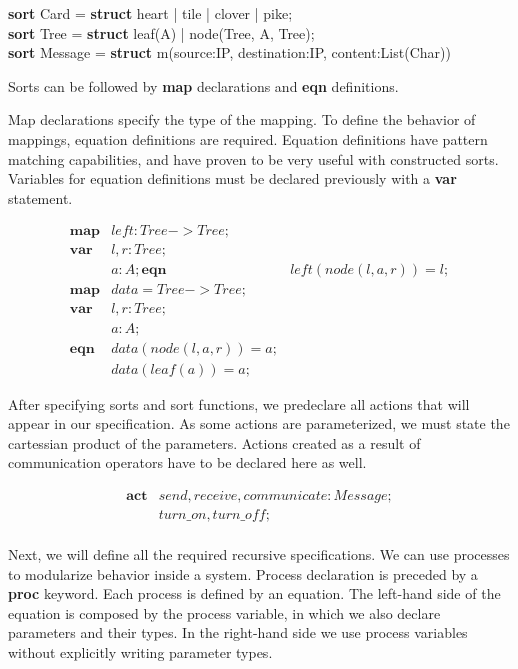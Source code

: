 \documentclass[11pt]{article}
\theoremstyle{definition}
\theoremstyle{plain}
\theoremstyle{definition}
\begin{document}
\begin{center}
	\textbf{sort} Card = \textbf{struct} heart | tile | clover | pike; \\
	\textbf{sort} Tree = \textbf{struct} leaf(A) | node(Tree, A, Tree); \\
	\textbf{sort} Message = \textbf{struct} m(source:IP, destination:IP, content:List(Char))
\end{center}

Sorts can be followed by \textbf{map} declarations and \textbf{eqn} definitions.

Map declarations specify the type of the mapping. To define the behavior of mappings, equation definitions are required. Equation definitions have pattern matching capabilities, and have proven to be very useful with constructed sorts. Variables for equation definitions must be declared previously with a \textbf{var} statement.

\begin{align}
	\textbf{map} & left : Tree -> Tree; \\
	\textbf{var} & l, r : Tree; \\
	& a : A;
	\textbf{eqn} & left(node(l,a,r)) = l; \\
	\textbf{map} & data = Tree -> Tree; \\
	\textbf{var} & l, r : Tree; \\
		& a : A; \\
	\textbf{eqn} & data(node(l,a,r)) = a;  \\
	& data(leaf(a)) = a;
\end{align}

After specifying sorts and sort functions, we predeclare all actions that will appear in our specification. As some actions are parameterized, we must state the cartessian product of the parameters. Actions created as a result of communication operators have to be declared here as well.

\begin{align}
	\textbf{act} & send, receive, communicate : Message; \\
				 & turn\_on, turn\_off; \\
\end{align}

Next, we will define all the required recursive specifications. We can use processes to modularize behavior inside a system. Process declaration is preceded by a \textbf{proc} keyword. Each process is defined by an equation. The left-hand side of the equation is composed by the process variable, in which we also declare parameters and their types. In the right-hand side we use process variables without explicitly writing parameter types.
\end{document}
